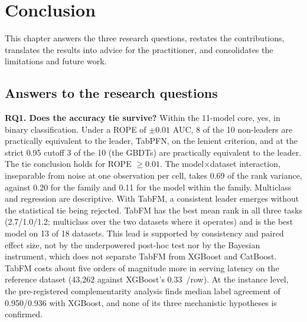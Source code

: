 \chapter{Conclusion}
\label{chap:conclusao}

This chapter answers the three research questions, restates the
contributions, translates the results into advice for the
practitioner, and consolidates the limitations and future work.

\section{Answers to the research questions}
\label{sec:conc-finais}

\textbf{RQ1. Does the accuracy tie survive?} Within the 11-model
core, yes, in binary classification. Under a ROPE of $\pm0.01$ AUC,
8 of the 10 non-leaders are practically equivalent to the leader,
TabPFN, on the lenient criterion, and at the strict 0.95 cutoff 3
of the 10 (the GBDTs) are practically equivalent to the leader. The
tie conclusion holds for ROPE $\geq 0.01$. The
model$\times$dataset interaction, inseparable from noise at one
observation per cell, takes 0.69 of the rank variance, against 0.20
for the family and 0.11 for the model within the family. Multiclass
and regression are descriptive. With TabFM, a consistent leader
emerges without the statistical tie being rejected. TabFM has the best mean rank in all three tasks (2.7/1.0/1.2; multiclass over the
two datasets where it operates) and is the best model on 13 of 18
datasets. This lead is supported by consistency and paired effect
size, not by the underpowered post-hoc test nor by the Bayesian
instrument, which does not separate TabFM from XGBoost
and CatBoost. TabFM costs about five orders of magnitude more in serving latency on the reference dataset (43{,}262 against XGBoost's
0.33~\us/row). At the instance level, the pre-registered
complementarity analysis finds median label agreement of 0.950/0.936
with XGBoost, and none of its three mechanistic hypotheses is
confirmed.

